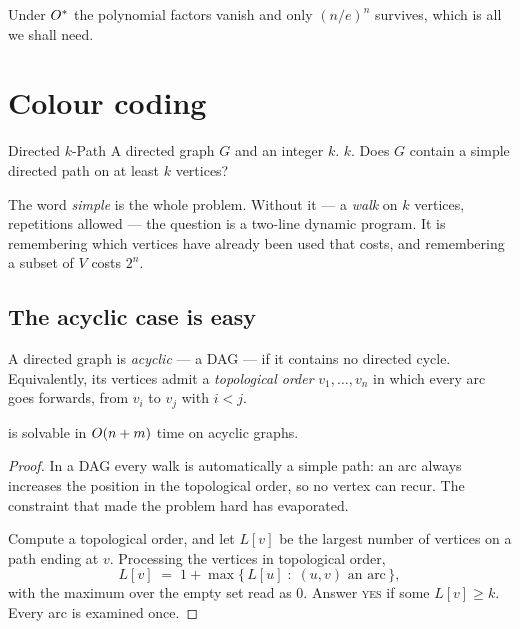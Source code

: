 Under $O^{*}$ the polynomial factors vanish and only $(n/e)^n$ survives, which
is all we shall need.

\section{Colour coding}
\label{sec:colour-coding}

\begin{probdef}{Directed $k$-Path}
  \instance A directed graph $G$ and an integer $k$.
  \parameter $k$.
  \question Does $G$ contain a simple directed path on at least $k$ vertices?
\end{probdef}

The word \emph{simple} is the whole problem. Without it --- a \emph{walk} on $k$
vertices, repetitions allowed --- the question is a two-line dynamic program. It
is remembering which vertices have already been used that costs, and remembering
a subset of $V$ costs $2^n$.

\subsection{The acyclic case is easy}

\begin{definition}\label{def:acyclic}
A directed graph is \emph{acyclic} --- a DAG --- if it contains no directed
cycle. Equivalently, its vertices admit a \emph{topological order}
$v_1, \ldots, v_n$ in which every arc goes forwards, from $v_i$ to $v_j$ with
$i < j$.
\end{definition}

\begin{proposition}\label{prop:kpath-dag}
 is solvable in $O\!\left(n+m\right)$ time on acyclic graphs.
\end{proposition}

\begin{proof}
In a DAG every walk is automatically a simple path: an arc always increases the
position in the topological order, so no vertex can recur. The constraint that
made the problem hard has evaporated.

Compute a topological order, and let $L[v]$ be the largest number of vertices on
a path ending at $v$. Processing the vertices in topological order,
\[ L[v] \;=\; 1 + \max\bigl\{\, L[u] \;:\; (u,v) \text{ an arc} \,\bigr\}, \]
with the maximum over the empty set read as $0$. Answer \textsc{yes} if some
$L[v] \ge k$. Every arc is examined once.
\end{proof}

